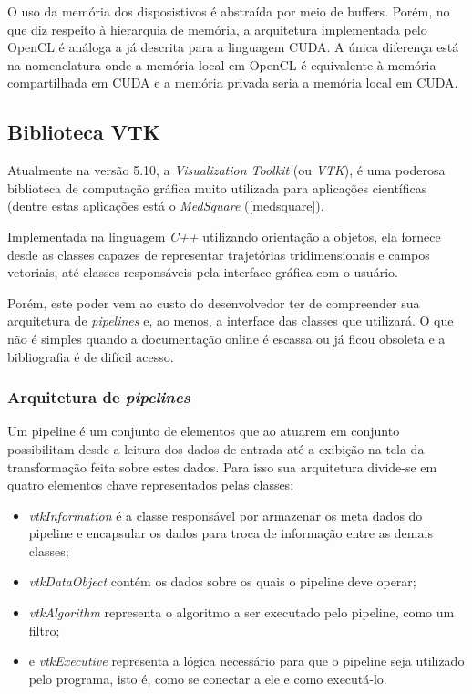  O uso da memória dos disposistivos é abstraída por meio de buffers. Porém, no que diz respeito à hierarquia de memória, a arquitetura implementada pelo OpenCL é análoga a já descrita para a linguagem CUDA. A única diferença está na nomenclatura onde a memória local em OpenCL é equivalente à memória compartilhada em CUDA e a memória privada seria a memória local em CUDA. 
  
  \subsection{Biblioteca VTK}
  Atualmente na versão 5.10, a \textit{Visualization Toolkit} (ou \textit{VTK}), é uma poderosa biblioteca de computação gráfica muito utilizada para aplicações científicas (dentre estas aplicações está o  \textit{MedSquare} (\ref{medsquare}).
  
  Implementada na linguagem \textit{C++} utilizando orientação a objetos, ela fornece desde as classes capazes de representar trajetórias tridimensionais e campos vetoriais, até classes responsáveis pela interface gráfica com o usuário.
  
  Porém, este poder vem ao custo do desenvolvedor ter de compreender sua arquitetura de \textit{pipelines} e, ao menos, a interface das classes que utilizará. O que não é simples quando a documentação online é escassa ou já ficou obsoleta e a bibliografia é de difícil acesso.
  
  \subsubsection{Arquitetura de \textit{pipelines}}
  Um pipeline é um conjunto de elementos que ao atuarem em conjunto possibilitam desde a leitura dos dados de entrada até a exibição na tela da transformação feita sobre estes dados. Para isso sua arquitetura divide-se em quatro elementos chave representados pelas classes:
  \begin{itemize}
    \item \textit{vtkInformation} é a classe responsável por armazenar os meta dados do pipeline e encapsular os dados para troca de informação entre as demais classes;
    \item \textit{vtkDataObject} contém os dados sobre os quais o pipeline deve operar;
    \item \textit{vtkAlgorithm} representa o algoritmo a ser executado pelo pipeline, como um filtro;
    \item e \textit{vtkExecutive} representa a lógica necessário para que o pipeline seja utilizado pelo programa, isto é, como se conectar a ele e como executá-lo.
  \end{itemize} 
  
